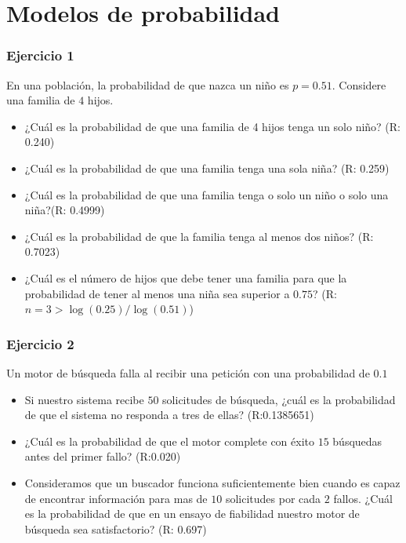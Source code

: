 \documentclass[
]{book}
\providecommand{\tightlist}{%
  \setlength{\itemsep}{0pt}\setlength{\parskip}{0pt}}
\begin{document}
\hypertarget{modelos-de-probabilidad}{%
\section{Modelos de probabilidad}\label{modelos-de-probabilidad}}

\hypertarget{ejercicio-1-4}{%
\subsubsection{Ejercicio 1}\label{ejercicio-1-4}}

En una población, la probabilidad de que nazca un niño es \(p=0.51\). Considere una familia de \(4\) hijos.

\begin{itemize}
\tightlist
\item
  ¿Cuál es la probabilidad de que una familia de 4 hijos tenga un solo niño? (R: 0.240)
\item
  ¿Cuál es la probabilidad de que una familia tenga una sola niña? (R: 0.259)
\item
  ¿Cuál es la probabilidad de que una familia tenga o solo un niño o solo una niña?(R: 0.4999)
\item
  ¿Cuál es la probabilidad de que la familia tenga al menos dos niños? (R: 0.7023)
\item
  ¿Cuál es el número de hijos que debe tener una familia para que la probabilidad de tener al menos una niña sea superior a \(0.75\)? (R:\(n=3>\log(0.25)/\log(0.51)\))
\end{itemize}

\hypertarget{ejercicio-2-4}{%
\subsubsection{Ejercicio 2}\label{ejercicio-2-4}}

Un motor de búsqueda falla al recibir una petición con una probabilidad de \(0.1\)

\begin{itemize}
\item
  Si nuestro sistema recibe \(50\) solicitudes de búsqueda, ¿cuál es la probabilidad de que el sistema no responda a tres de ellas? (R:0.1385651)
\item
  ¿Cuál es la probabilidad de que el motor complete con éxito \(15\) búsquedas antes del primer fallo? (R:0.020)
\item
  Consideramos que un buscador funciona suficientemente bien cuando es capaz de encontrar información para mas de \(10\) solicitudes por cada \(2\) fallos. ¿Cuál es la probabilidad de que en un ensayo de fiabilidad nuestro motor de búsqueda sea satisfactorio?
  (R: 0.697)
\end{itemize}
\end{document}
